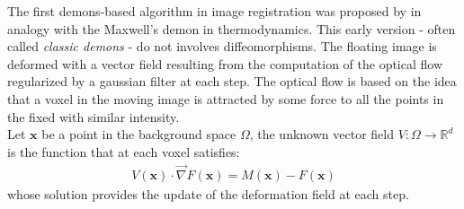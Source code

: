 The first demons-based algorithm in image registration was proposed by \cite{thirion1998image} in analogy with the Maxwell's demon in thermodynamics. This early version - often called \emph{classic demons} - do not involves diffeomorphisms. The floating image is deformed with a vector field resulting from the computation of the optical flow regularized by a gaussian filter at each step. The optical flow is based on the idea that a voxel in the moving image is attracted by some force to all the points in the fixed with similar intensity. \\
Let $\mathbf{x}$ be a point in the background space $\Omega$, the unknown vector field $V:\Omega \rightarrow \mathbb{R}^{d}$ is the function that at each voxel satisfies:
\begin{align}\label{eq:optical_flow_initial}
V(\mathbf{x})\cdot \vec{\nabla}F(\mathbf{x}) = M(\mathbf{x}) - F(\mathbf{x})
\end{align}
whose solution provides the update of the deformation field at each step.\\


